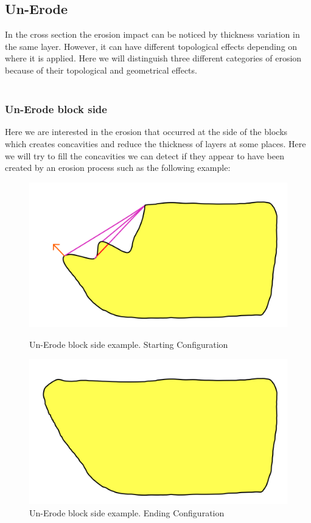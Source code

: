 \documentclass[12pt, a4paper]{report} %
\begin{document}
\subsection{Un-Erode}
\label{sub:unerode}

In the cross section the erosion impact can be noticed by thickness variation in the same layer. However, it can have different topological effects depending on where it is applied. Here we will distinguish three different categories of erosion because of their topological and geometrical effects.\\\\

\subsubsection{Un-Erode block side}
Here we are interested in the erosion that occurred at the side of the blocks which creates concavities and reduce the thickness of layers at some places. Here we will try to fill the concavities we can detect if they appear to have been created by an erosion process such as the following example:
\begin{figure}[H]
    \begin{minipage}[c]{.46\linewidth}
        \centering
        \includegraphics[scale=0.2]{unErodeSideDescription0.png}
	\caption{Un-Erode block side example. Starting Configuration}
    \end{minipage}
    \hfill%
    \begin{minipage}[c]{.46\linewidth}
        \centering
        \includegraphics[scale=0.2]{unErodeSideDescription1.png}
	\caption{Un-Erode block side example. Ending Configuration}
    \end{minipage}
\end{figure}\\
\end{document}
